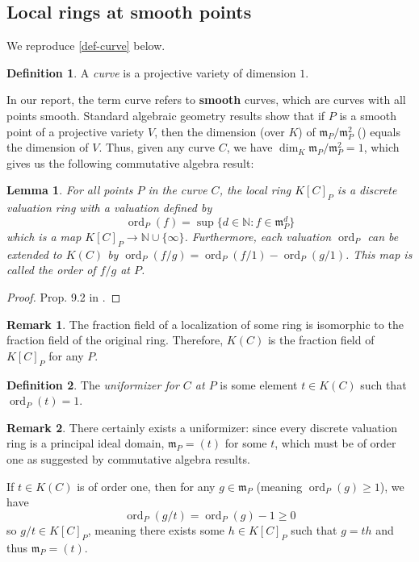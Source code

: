 \documentclass[12pt]{article}
\newtheorem{lemma}{Lemma}[subsection]
\theoremstyle{remark}
\theoremstyle{definition}
\newtheorem{remark}{Remark}[subsection]
\newtheorem{definition}{Definition}[subsection]
\newcommand{\ord}[0]{\operatorname{ord}}
\newcommand{\N}[0]{\mathbb{N}}
\begin{document}
    \subsection{Local rings at smooth points}
        We reproduce \autoref{def-curve} below.
        \begin{definition}
            A \textit{curve} is a projective variety of dimension $1$.
        \end{definition}
        In our report, the term curve refers to \textbf{smooth} curves, which are curves with all points smooth. Standard algebraic geometry results show that if $P$ is a smooth point of a projective variety $V$, then the dimension (over $K$) of $\mathfrak m_P/\mathfrak m_P^2$ (\cite{hartshorne_2010_algebraic}) equals the dimension of $V$. Thus, given any curve $C$, we have $\dim_K \mathfrak m_P/\mathfrak m_P^2=1$, which gives us the following commutative algebra result:
        \begin{lemma}\label{lemma-ord}
            For all points $P$ in the curve $C$, the local ring $K[C]_P$ is a discrete valuation ring with a valuation defined by
            \[\ord_P(f)=\sup\{d\in\N:f\in\mathfrak m_P^d\}\]
            which is a map $K[C]_P\to\N\cup\{\infty\}$. Furthermore, each valuation $\ord_P$ can be extended to $K(C)$ by $\ord_P(f/g)=\ord_P(f/1)-\ord_P(g/1)$. This map is called \textup{the order of $f/g$ at $P$}.
        \end{lemma}
        \begin{proof}
            Prop. 9.2 in \cite{atiyah1994introduction}.
        \end{proof}
        \begin{remark}
            The fraction field of a localization of some ring is isomorphic to the fraction field of the original ring. Therefore, $K(C)$ is the fraction field of $K[C]_P$ for any $P$.
        \end{remark}
        \begin{definition}
            The \textit{uniformizer for $C$ at $P$} is some element $t\in K(C)$ such that $\ord_P(t)=1$.
        \end{definition}
        \begin{remark}\label{remark-unif-exist}
            There certainly exists a uniformizer: since every discrete valuation ring is a principal ideal domain, $\mathfrak m_P=(t)$ for some $t$, which must be of order one as suggested by commutative algebra results.

            If $t\in K(C)$ is of order one, then for any $g\in\mathfrak m_P$ (meaning $\ord_P(g)\geqslant 1$), we have
            \[\ord_P(g/t)=\ord_P (g)-1\geqslant 0\]
            so $g/t\in K[C]_P$, meaning there exists some $h\in K[C]_P$ such that $g=th$ and thus $\mathfrak m_P=(t)$.
        \end{remark}
\end{document}
